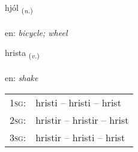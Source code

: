 \documentclass[frontgrid, backgrid]{flacards}\usepackage[]{graphicx}\usepackage[]{color}
\begin{document}
\renewcommand{\flhead}{\vskip5pt \fboxsep=0pt {\small\bfseries\footnotesize Nafnorð | Noun}}
\renewcommand{\fcfoot}{\vskip5pt \fboxsep=0pt \hspace{2pt}{\small\bfseries\footnotesize 2K}}

\renewcommand{\blhead}{\vskip5pt {\small\bfseries\footnotesize Nafnorð | Noun }}
\renewcommand{\bcfoot}{\vskip5pt \hspace{2pt}{\small\bfseries\footnotesize 2K}}


{hjól \small{\textsubscript{(\textit{n.})}} \\[1ex] %
\textphonetic{[çouːl]} \\
en: \emph{bicycle; wheel} \\  [2ex]
\renewcommand*{\arraystretch}{0.8}
}

\renewcommand{\flhead}{\vskip5pt \fboxsep=0pt {\small\bfseries\footnotesize Sagnorð | Verb}}
\renewcommand{\fcfoot}{\vskip5pt \fboxsep=0pt \hspace{2pt}{\small\bfseries\footnotesize 2K}}

\renewcommand{\blhead}{\vskip5pt {\small\bfseries\footnotesize Sagnorð | Verb }}
\renewcommand{\bcfoot}{\vskip5pt \hspace{2pt}{\small\bfseries\footnotesize 2K}}


{hrista \small{\textsubscript{(\textit{v.})}} \\[1ex] %
\textphonetic{[r̥ɪsta]} \\
en: \emph{shake} \\  [2ex]
\renewcommand*{\arraystretch}{0.8}
\begin{tabular}{p{1cm}l}
\textsc{1sg}: & hristi -- hristi -- hrist \\ 
\textsc{2sg}: & hristir -- hristir -- hrist \\ 
\textsc{3sg}: & hristir -- hristi -- hrist \\ 
\end{tabular}
}
\end{document}
